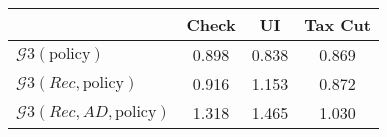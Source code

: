 \begin{tabular}{@{}lccc@{}} 
\toprule 
                          & Check      & UI    & Tax Cut    \\  \midrule 
$\mathcal{G}3(\text{policy})$ & 0.898  & 0.838  & 0.869     \\ 
$\mathcal{G}3(Rec,\text{policy})$ & 0.916  & 1.153  & 0.872     \\ 
$\mathcal{G}3(Rec, AD,\text{policy})$ & 1.318  & 1.465  & 1.030     \\ 
\end{tabular}  

